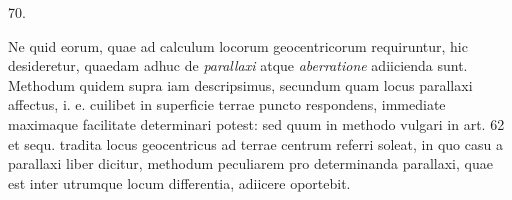 \par{}\medskip
\hypertarget{native-089-article070}{}
\begin{center}70.\end{center}
Ne quid eorum, quae ad calculum locorum geocentricorum requiruntur, hic desideretur, quaedam adhuc de \emph{parallaxi} atque \emph{aberratione} adiicienda sunt. Methodum quidem supra iam descripsimus, secundum quam locus parallaxi affectus, i. e. cuilibet in superficie terrae puncto respondens, immediate maximaque facilitate determinari potest: sed quum in methodo vulgari in art. 62 et sequ. tradita locus geocentricus ad terrae centrum referri soleat, in quo casu a parallaxi liber dicitur, methodum peculiarem pro determinanda parallaxi, quae est inter utrumque locum differentia, adiicere oportebit.

